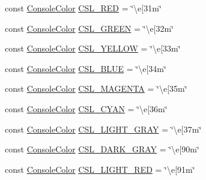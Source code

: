 \begin{DoxyCompactItemize}
\item 
const \mbox{\hyperlink{namespaceo_a_a747e07c1977a29f3e1d38683043ec927}{Console\+Color}} \mbox{\hyperlink{namespaceo_a_a74d7b4bf658c6ba0f3ad396dd03107ee}{C\+S\+L\+\_\+\+R\+ED}} = \char`\"{}\textbackslash{}e\mbox{[}31m\char`\"{}
\item 
const \mbox{\hyperlink{namespaceo_a_a747e07c1977a29f3e1d38683043ec927}{Console\+Color}} \mbox{\hyperlink{namespaceo_a_ae7acd3d0f7aca3cd6e09696c4a2efba6}{C\+S\+L\+\_\+\+G\+R\+E\+EN}} = \char`\"{}\textbackslash{}e\mbox{[}32m\char`\"{}
\item 
const \mbox{\hyperlink{namespaceo_a_a747e07c1977a29f3e1d38683043ec927}{Console\+Color}} \mbox{\hyperlink{namespaceo_a_a4f2c2032619b23acb3418d4304c3ac9b}{C\+S\+L\+\_\+\+Y\+E\+L\+L\+OW}} = \char`\"{}\textbackslash{}e\mbox{[}33m\char`\"{}
\item 
const \mbox{\hyperlink{namespaceo_a_a747e07c1977a29f3e1d38683043ec927}{Console\+Color}} \mbox{\hyperlink{namespaceo_a_a0268379a1ec8582fa15dee294cdf078b}{C\+S\+L\+\_\+\+B\+L\+UE}} = \char`\"{}\textbackslash{}e\mbox{[}34m\char`\"{}
\item 
const \mbox{\hyperlink{namespaceo_a_a747e07c1977a29f3e1d38683043ec927}{Console\+Color}} \mbox{\hyperlink{namespaceo_a_ae92259d8d975416fe120fe82ef72036e}{C\+S\+L\+\_\+\+M\+A\+G\+E\+N\+TA}} = \char`\"{}\textbackslash{}e\mbox{[}35m\char`\"{}
\item 
const \mbox{\hyperlink{namespaceo_a_a747e07c1977a29f3e1d38683043ec927}{Console\+Color}} \mbox{\hyperlink{namespaceo_a_a10ac82cded93f3765e06b721f678ecd6}{C\+S\+L\+\_\+\+C\+Y\+AN}} = \char`\"{}\textbackslash{}e\mbox{[}36m\char`\"{}
\item 
const \mbox{\hyperlink{namespaceo_a_a747e07c1977a29f3e1d38683043ec927}{Console\+Color}} \mbox{\hyperlink{namespaceo_a_a10e48d976407a1f5b50922a605191543}{C\+S\+L\+\_\+\+L\+I\+G\+H\+T\+\_\+\+G\+R\+AY}} = \char`\"{}\textbackslash{}e\mbox{[}37m\char`\"{}
\item 
const \mbox{\hyperlink{namespaceo_a_a747e07c1977a29f3e1d38683043ec927}{Console\+Color}} \mbox{\hyperlink{namespaceo_a_a928cf177e35d3f1dfb86f9efeb29c749}{C\+S\+L\+\_\+\+D\+A\+R\+K\+\_\+\+G\+R\+AY}} = \char`\"{}\textbackslash{}e\mbox{[}90m\char`\"{}
\item 
const \mbox{\hyperlink{namespaceo_a_a747e07c1977a29f3e1d38683043ec927}{Console\+Color}} \mbox{\hyperlink{namespaceo_a_a39671a401085ee55f2d9c6d412c6f3cc}{C\+S\+L\+\_\+\+L\+I\+G\+H\+T\+\_\+\+R\+ED}} = \char`\"{}\textbackslash{}e\mbox{[}91m\char`\"{}
\item 

\end{DoxyCompactItemize}
